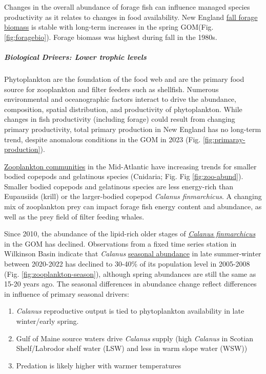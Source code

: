 \documentclass[
  10pt,
]{article}
\providecommand{\tightlist}{%
  \setlength{\itemsep}{0pt}\setlength{\parskip}{0pt}}
\begin{document}
Changes in the overall abundance of forage fish can influence managed species productivity as it relates to changes in food availability. New England \href{https://noaa-edab.github.io/catalog/forage_index.html}{fall forage biomass} is stable with long-term increases in the spring GOM(Fig. \ref{fig:foragebio}). Forage biomass was highest during fall in the 1980s.

\hypertarget{biological-drivers-lower-trophic-levels}{%
\subparagraph{Biological Drivers: Lower trophic levels}\label{biological-drivers-lower-trophic-levels}}

Phytoplankton are the foundation of the food web and are the primary food source for zooplankton and filter feeders such as shellfish. Numerous environmental and oceanographic factors interact to drive the abundance, composition, spatial distribution, and productivity of phytoplankton. While changes in fish productivity (including forage) could result from changing primary productivity, total primary production in New England has no long-term trend, despite anomalous conditions in the GOM in 2023 (Fig. \ref{fig:primaray-production}).

\href{https://noaa-edab.github.io/catalog/zoo_abundance_anom.html}{Zooplankton communities} in the Mid-Atlantic have increasing trends for smaller bodied copepods and gelatinous
species (Cnidaria; Fig. Fig \ref{fig:zoo-abund}). Smaller bodied copepods and gelatinous species are less energy-rich than Eupausiids
(krill) or the larger-bodied copepod \emph{Calanus finmarchicus}. A changing mix of zooplankton prey can impact forage
fish energy content and abundance, as well as the prey field of filter feeding whales.

Since 2010, the abundance of the lipid-rich older stages of \href{https://noaa-edab.github.io/catalog/wbts_mesozooplankton.html}{\emph{Calanus finmarchicus}} in the GOM has declined. Observations from a fixed time series station in Wilkinson Basin indicate that \emph{Calanus} \href{https://noaa-edab.github.io/catalog/calanus_variation.html}{seasonal abundance} in late summer-winter between 2020-2022 has declined to 30-40\% of its population level in 2005-2008 (Fig. \ref{fig:zooplankton-season}), although spring abundances are still the same as 15-20 years ago. The seasonal differences in abundance change reflect differences in influence of primary seasonal drivers:

\begin{enumerate}
\def\labelenumi{\arabic{enumi}.}
\tightlist
\item
  \emph{Calanus} reproductive output is tied to phytoplankton availability in late winter/early spring.
\item
  Gulf of Maine source waters drive \emph{Calanus} supply (high \emph{Calanus} in Scotian Shelf/Labrodor shelf water (LSW) and less in warm slope water (WSW))
\item
  Predation is likely higher with warmer temperatures
\end{enumerate}
\end{document}
